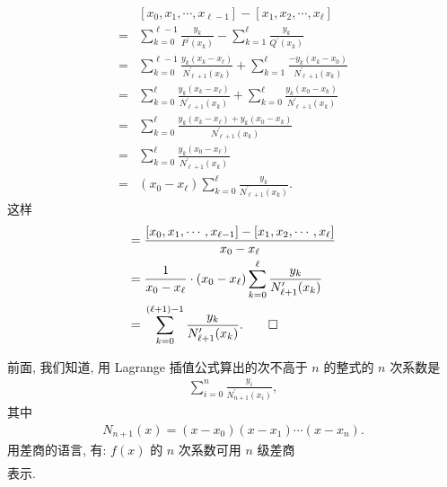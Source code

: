 \begin{pf}
\begin{align*}
             & [x_{0}, x_{1}, \cdots, x_{\ell - 1}] - [x_{1}, x_{2},
        \cdots, x_{\ell}]                                            \\
        = {} & \sum_{k = 0}^{\ell-1} \frac{y_k}{P^{\prime} (x_k)}
        - \sum_{k = 1}^{\ell} \frac{y_k}{Q^{\prime} (x_k)}           \\
        = {} & \sum_{k = 0}^{\ell-1} \frac{y_k (x_k - x_{\ell})}
        {N_{\ell + 1}^{\prime} (x_k)}
        + \sum_{k = 1}^{\ell} \frac{-y_k (x_k - x_0)}
        {N_{\ell + 1}^{\prime} (x_k)}                                \\
        = {} & \sum_{k = 0}^{\ell} \frac{y_k (x_k - x_{\ell})}
        {N_{\ell + 1}^{\prime} (x_k)}
        + \sum_{k = 0}^{\ell} \frac{y_k (x_0 - x_k)}
        {N_{\ell + 1}^{\prime} (x_k)}                                \\
        = {} & \sum_{k = 0}^{\ell} \frac{y_k (x_k - x_{\ell})
            + y_k (x_0 - x_k)}
        {N_{\ell + 1}^{\prime} (x_k)}                                \\
        = {} & \sum_{k = 0}^{\ell} \frac{y_k (x_0 - x_{\ell})}
        {N_{\ell + 1}^{\prime} (x_k)}                                \\
        = {} & (x_0 - x_{\ell}) \sum_{k = 0}^{\ell} \frac{y_k}
        {N_{\ell + 1}^{\prime} (x_k)}.
    \end{align*}
    这样
    \begin{align*}
        [x_{0}, x_{1}, \cdots, x_{\ell}]
        = {} & \frac{[x_{0}, x_{1}, \cdots, x_{\ell - 1}]
        - [x_{1}, x_{2}, \cdots, x_{\ell}]}{x_0 - x_{\ell}}          \\
        = {} & \frac{1}{x_0 - x_{\ell}} \cdot (x_0 - x_{\ell})
        \sum_{k = 0}^{\ell} \frac{y_k} {N_{\ell + 1}^{\prime} (x_k)} \\
        = {} & \sum_{k = 0}^{(\ell + 1) - 1} \frac{y_k}
        {N_{\ell + 1}^{\prime} (x_k)}. \qedhere
    \end{align*}
\end{pf}

\begin{remark}
    前面, 我们知道, 用 Lagrange 插值公式算出的次不高于 $n$ 的整式的 $n$ 次系数是
    \begin{align*}
        \sum_{i = 0}^{n} \frac{y_i}{N_{n+1}^{\prime} (x_i)},
    \end{align*}
    其中
    \begin{align*}
        N_{n+1} (x) = (x - x_0) (x - x_1) \cdots (x - x_n).
    \end{align*}
    用差商的语言, 有: $f(x)$ 的 $n$ 次系数可用 $n$ 级差商
    \begin{align*}
        [x_0, x_1, \cdots, x_n]
    \end{align*}
    表示.
\end{remark}


